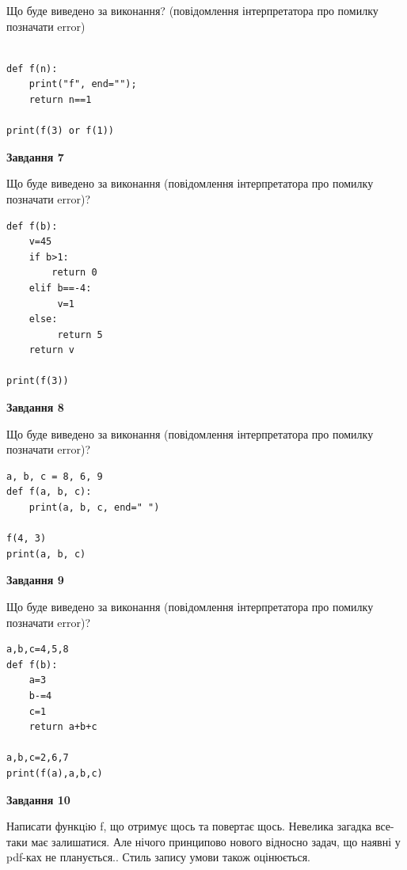 \documentclass[12pt, ukrainian]{article}
\begin{document}
{\begin {large}
Що буде виведено за виконання? (повідомлення інтерпретатора про помилку позначати error)\par
\begin{verbatim}

def f(n):
    print("f", end="");
    return n==1

print(f(3) or f(1))
\end{verbatim}

{\begin {center}\textbf{Завдання 7}\end {center}}

Що буде виведено за виконання (повідомлення інтерпретатора про помилку позначати error)?\par
\begin{verbatim}
def f(b):
    v=45
    if b>1: 
        return 0
    elif b==-4:
         v=1
    else:
         return 5
    return v

print(f(3))
\end{verbatim}

{\begin {center}\textbf{Завдання 8}\end {center}}

Що буде виведено за виконання (повідомлення інтерпретатора про помилку позначати error)?\par
\begin{verbatim}
a, b, c = 8, 6, 9
def f(a, b, c):
    print(a, b, c, end=" ")

f(4, 3)
print(a, b, c)
\end{verbatim}

{\begin {center}\textbf{Завдання 9}\end {center}}

Що буде виведено за виконання (повідомлення інтерпретатора про помилку позначати error)?\par
\begin{verbatim}
a,b,c=4,5,8
def f(b):
    a=3
    b-=4
    c=1
    return a+b+c

a,b,c=2,6,7
print(f(a),a,b,c)
\end{verbatim}

{\begin {center}\textbf{Завдання 10}\end {center}}


Написати функцiю f, що отримує щось та повертає щось. Невелика загадка все-таки має залишатися. Але нічого принципово нового відносно задач, що наявні у pdf-ках не планується.. Стиль запису умови також оцінюється.\par
\end {large}}
\newpage
\end{document}
